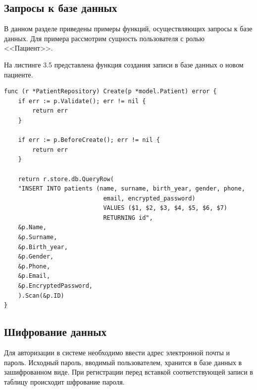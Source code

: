 \clearpage

\subsection*{Запросы к базе данных}

В данном разделе приведены примеры функций, осуществляющих запросы к базе данных. Для примера рассмотрим сущность пользователя с ролью <<Пациент>>.

На листинге 3.5 представлена функция создания записи в базе данных о новом пациенте.

\begin{lstlisting}[caption={Функция создания записи}]
func (r *PatientRepository) Create(p *model.Patient) error {
	if err := p.Validate(); err != nil {
		return err
	}
	
	if err := p.BeforeCreate(); err != nil {
		return err
	}
	
	return r.store.db.QueryRow(
	"INSERT INTO patients (name, surname, birth_year, gender, phone, 
							email, encrypted_password) 
							VALUES ($1, $2, $3, $4, $5, $6, $7) 
							RETURNING id",
	&p.Name,
	&p.Surname,
	&p.Birth_year,
	&p.Gender,
	&p.Phone,
	&p.Email,
	&p.EncryptedPassword,
	).Scan(&p.ID)
}
\end{lstlisting}
%
%
%		
%	

\subsection*{Шифрование данных}

Для авторизации в системе необходимо ввести адрес электронной почты и пароль. Исходный пароль, вводимый пользователем, хранится в базе данных в зашифрованном виде. При регистрации перед вставкой соответствующей записи в таблицу происходит шфрование пароля.

